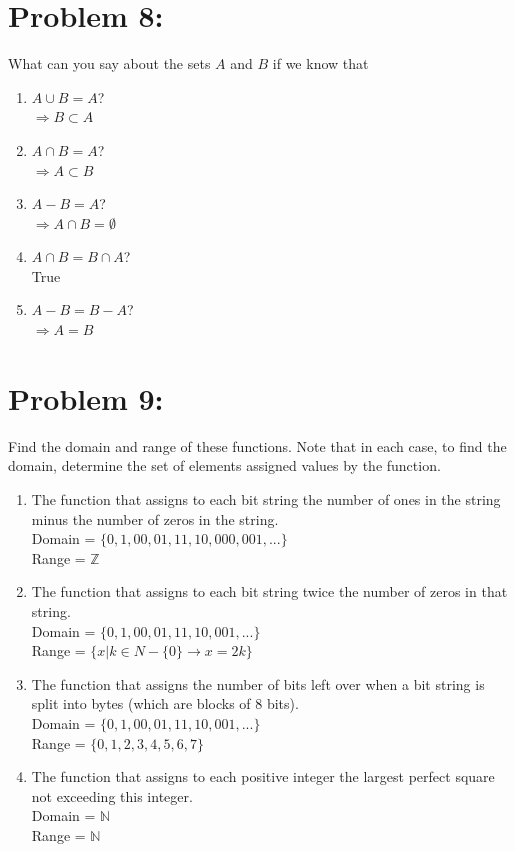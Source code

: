 \documentclass[12pt,en,a4paper]{article}
\begin{document}
	\section*{Problem 8:}
	What can you say about the sets $A$ and $B$ if we know that
	\begin{enumerate}
		\item $A \cup B=A$?\\
		$\Rightarrow B \subset A$
		\item $A \cap B=A$?\\
		$\Rightarrow A \subset B$
		\item $A-B=A$?\\
		$\Rightarrow A \cap B = \emptyset$
		\item $A \cap B=B \cap A$?\\
		True
		\item $A-B=B-A$?\\
		$\Rightarrow A = B$
	\end{enumerate}
\newpage
{}
	\section*{Problem 9:}
	Find the domain and range of these functions. Note that in each case, to find the domain, determine the set of elements assigned values by the function.
	\begin{enumerate}
		\item The function that assigns to each bit string the number of ones in the string minus the number of zeros in the string.\\
		
		Domain = $\{0,1,00,01,11,10,000,001,...\}$\\
		Range = $\mathbb{Z}$
		\item The function that assigns to each bit string twice the number of zeros in that string.\\
		
		Domain = $\{0,1,00,01,11,10,001,...\}$\\
		Range = $\{x|k\in N-\{0\} \rightarrow x=2k\}$
		\item The function that assigns the number of bits left over when a bit string is split into bytes (which are blocks of 8 bits).\\
		
		Domain = $\{0,1,00,01,11,10,001,...\}$\\
		Range = $\{0,1,2,3,4,5,6,7\}$
		\item The function that assigns to each positive integer the largest perfect square not exceeding this integer.\\
		
		Domain = $\mathbb{N}$\\
		Range = $\mathbb{N}$
	\end{enumerate}
\newpage
{}
\end{document}
